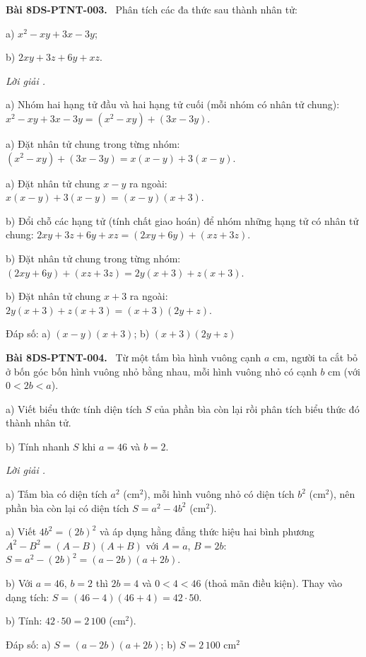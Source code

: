 \documentclass[12pt,a4paper]{article}
\newenvironment{problem}[1][]{\par\medskip\noindent\textbf{Bài #1.}\ }{\par}
\newenvironment{solution}[1][]{\par\noindent\textit{Lời giải #1.}\par}{\par}
\begin{document}
\begin{problem}[8DS-PTNT-003]
Phân tích các đa thức sau thành nhân tử:

a) $x^2 - xy + 3x - 3y$;

b) $2xy + 3z + 6y + xz$.

\begin{solution}
a) Nhóm hai hạng tử đầu và hai hạng tử cuối (mỗi nhóm có nhân tử chung): $x^2 - xy + 3x - 3y = (x^2 - xy) + (3x - 3y)$.

a) Đặt nhân tử chung trong từng nhóm: $(x^2 - xy) + (3x - 3y) = x(x - y) + 3(x - y)$.

a) Đặt nhân tử chung $x - y$ ra ngoài: $x(x - y) + 3(x - y) = (x - y)(x + 3)$.

b) Đổi chỗ các hạng tử (tính chất giao hoán) để nhóm những hạng tử có nhân tử chung: $2xy + 3z + 6y + xz = (2xy + 6y) + (xz + 3z)$.

b) Đặt nhân tử chung trong từng nhóm: $(2xy + 6y) + (xz + 3z) = 2y(x + 3) + z(x + 3)$.

b) Đặt nhân tử chung $x + 3$ ra ngoài: $2y(x + 3) + z(x + 3) = (x + 3)(2y + z)$.

Đáp số: a) $\boxed{(x - y)(x + 3)}$; b) $\boxed{(x + 3)(2y + z)}$
\end{solution}
\end{problem}

\begin{problem}[8DS-PTNT-004]
Từ một tấm bìa hình vuông cạnh $a$ cm, người ta cắt bỏ ở bốn góc bốn hình vuông nhỏ bằng nhau, mỗi hình vuông nhỏ có cạnh $b$ cm (với $0 < 2b < a$).

a) Viết biểu thức tính diện tích $S$ của phần bìa còn lại rồi phân tích biểu thức đó thành nhân tử.

b) Tính nhanh $S$ khi $a = 46$ và $b = 2$.

\begin{solution}
a) Tấm bìa có diện tích $a^2$ (cm$^2$), mỗi hình vuông nhỏ có diện tích $b^2$ (cm$^2$), nên phần bìa còn lại có diện tích $S = a^2 - 4b^2$ (cm$^2$).

a) Viết $4b^2 = (2b)^2$ và áp dụng hằng đẳng thức hiệu hai bình phương $A^2 - B^2 = (A - B)(A + B)$ với $A = a$, $B = 2b$: $S = a^2 - (2b)^2 = (a - 2b)(a + 2b)$.

b) Với $a = 46$, $b = 2$ thì $2b = 4$ và $0 < 4 < 46$ (thoả mãn điều kiện). Thay vào dạng tích: $S = (46 - 4)(46 + 4) = 42 \cdot 50$.

b) Tính: $42 \cdot 50 = 2\,100$ (cm$^2$).

Đáp số: a) $\boxed{S = (a - 2b)(a + 2b)}$; b) $\boxed{S = 2\,100 \text{ cm}^2}$
\end{solution}
\end{problem}
\end{document}

